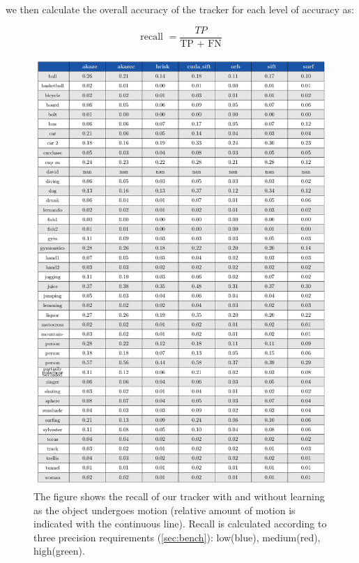 we then calculate the overall accuracy of the tracker for each level of accuracy as:

\begin{equation}
\text{recall } = \frac{TP}{\text{TP } + \text{ FN}}
\end{equation}



\begin{figure}[t]
\centerline{%
		\includegraphics[width=0.98\linewidth]{tables/test.pdf}}
    \vspace{-2mm} 
	\caption{The figure shows the recall of our tracker with and
          without learning as the object undergoes motion (relative
          amount of motion is indicated with the continuous
          line). Recall is calculated according to three precision
          requirements (\ref{sec:bench}): low(blue), medium(red),
          high(green).}
	\label{fig:learnvsno}
\end{figure}

